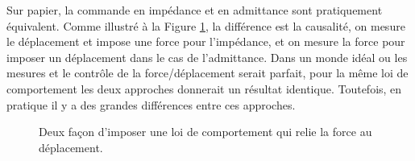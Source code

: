 Sur papier, la commande en impédance et en admittance sont pratiquement équivalent. Comme illustré à la Figure \ref{fig:impedanceadmitancecontrolbloc}, la différence est la causalité, on mesure le déplacement et impose une force pour l'impédance, et on mesure la force pour imposer un déplacement dans le cas de l'admittance. Dans un monde idéal ou les mesures et le contrôle de la force/déplacement serait parfait, pour la même loi de comportement les deux approches donnerait un résultat identique. Toutefois, en pratique il y a des grandes différences entre ces approches. 
\begin{figure}[H]
        \centering
				\hspace{30pt}
        \caption{Deux façon d'imposer une loi de comportement qui relie la force au déplacement.}
				\label{fig:impedanceadmitancecontrolbloc}
\end{figure}

